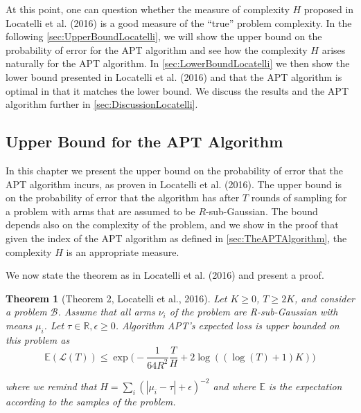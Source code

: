 \documentclass[11pt,]{article}
\newtheorem{theorem}{Theorem}
\begin{document}
At this point, one can question whether the measure of complexity \(H\)
proposed in Locatelli et al. (2016) is a good measure of the ``true''
problem complexity. In the following \autoref{sec:UpperBoundLocatelli},
we will show the upper bound on the probability of error for the APT
algorithm and see how the complexity \(H\) arises naturally for the APT
algorithm. In \autoref{sec:LowerBoundLocatelli} we then show the lower
bound presented in Locatelli et al. (2016) and that the APT algorithm is
optimal in that it matches the lower bound. We discuss the results and
the APT algorithm further in \autoref{sec:DiscussionLocatelli}.

\subsection{\texorpdfstring{Upper Bound for the APT Algorithm
\label{sec:UpperBoundLocatelli}}{Upper Bound for the APT Algorithm }}\label{upper-bound-for-the-apt-algorithm}

In this chapter we present the upper bound on the probability of error
that the APT algorithm incurs, as proven in Locatelli et al. (2016). The
upper bound is on the probability of error that the algorithm has after
\(T\) rounds of sampling for a problem with arms that are assumed to be
\(R\)-sub-Gaussian. The bound depends also on the complexity of the
problem, and we show in the proof that given the index of the APT
algorithm as defined in \autoref{sec:TheAPTAlgorithm}, the complexity
\(H\) is an appropriate measure.

We now state the theorem as in Locatelli et al. (2016) and present a
proof.

\begin{theorem}[Theorem 2, Locatelli et al., 2016] \label{theorem:LocatelliTheorem4}
Let $K \geq 0$, $T \geq 2K$, and consider a problem $\mathcal{B}$. Assume that all arms $\nu_i$ of the problem are R-sub-Gaussian with means $\mu_i$. Let $\tau \in \mathbb{R}, \epsilon \geq 0$. Algorithm APT's expected loss is upper bounded on this problem as 
\begin{equation*} \mathbb{E}(\mathcal{L}(T)) \leq \exp
\Big(-\frac{1}{64R^2}\frac{T}{H} + 2 \log((\log(T) + 1)K)\Big) \end{equation*}

where we remind that $H = \sum_i (|\mu_i - \tau | + \epsilon)^{-2}$ and where
$\mathbb{E}$ is the expectation according to the samples of the problem.
\end{theorem}
\end{document}
